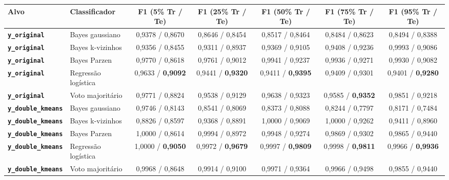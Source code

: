 \documentclass[a4paper,11pt]{article}
\begin{document}
\begin{center}
\begin{minipage}{\linewidth}
\centering
{}
\footnotesize
\sloppy
\setlength{\tabcolsep}{2.5pt}
\renewcommand{\arraystretch}{1.18}
\begin{tabularx}{\linewidth}{P{2.25cm} l C C C C C}
\toprule
\textbf{Alvo} & \textbf{Classificador} & \textbf{F1 (5\% Tr / Te)} & \textbf{F1 (25\% Tr / Te)} & \textbf{F1 (50\% Tr / Te)} & \textbf{F1 (75\% Tr / Te)} & \textbf{F1 (95\% Tr / Te)} \\
\midrule
\textbf{\texttt{y\_\allowbreak original}} & Bayes gaussiano & 0,9378 / 0,8670 & 0,8646 / 0,8454 & 0,8517 / 0,8464 & 0,8484 / 0,8623 & 0,8494 / 0,8388 \\
\textbf{\texttt{y\_\allowbreak original}} & Bayes k-vizinhos & 0,9356 / 0,8455 & 0,9311 / 0,8937 & 0,9369 / 0,9105 & 0,9408 / 0,9236 & 0,9993 / 0,9086 \\
\textbf{\texttt{y\_\allowbreak original}} & Bayes Parzen & 0,9770 / 0,8618 & 0,9761 / 0,9012 & 0,9941 / 0,9237 & 0,9936 / 0,9271 & 0,9930 / 0,9082 \\
\textbf{\texttt{y\_\allowbreak original}} & Regressão logística & 0,9633 / \textbf{0,9092} & 0,9441 / \textbf{0,9320} & 0,9411 / \textbf{0,9395} & 0,9409 / 0,9301 & 0,9401 / \textbf{0,9280} \\
\textbf{\texttt{y\_\allowbreak original}} & Voto majoritário & 0,9771 / 0,8824 & 0,9538 / 0,9129 & 0,9638 / 0,9323 & 0,9585 / \textbf{0,9352} & 0,9851 / 0,9218 \\
\textbf{\texttt{y\_\allowbreak double\_\allowbreak kmeans}} & Bayes gaussiano & 0,9746 / 0,8143 & 0,8541 / 0,8069 & 0,8373 / 0,8088 & 0,8244 / 0,7797 & 0,8171 / 0,7484 \\
\textbf{\texttt{y\_\allowbreak double\_\allowbreak kmeans}} & Bayes k-vizinhos & 0,8826 / 0,8597 & 0,9368 / 0,8891 & 1,0000 / 0,9069 & 1,0000 / 0,9262 & 0,9411 / 0,8960 \\
\textbf{\texttt{y\_\allowbreak double\_\allowbreak kmeans}} & Bayes Parzen & 1,0000 / 0,8614 & 0,9994 / 0,8972 & 0,9948 / 0,9274 & 0,9869 / 0,9302 & 0,9865 / 0,9440 \\
\textbf{\texttt{y\_\allowbreak double\_\allowbreak kmeans}} & Regressão logística & 1,0000 / \textbf{0,9050} & 0,9972 / \textbf{0,9679} & 0,9997 / \textbf{0,9809} & 0,9998 / \textbf{0,9811} & 0,9966 / \textbf{0,9936} \\
\textbf{\texttt{y\_\allowbreak double\_\allowbreak kmeans}} & Voto majoritário & 0,9968 / 0,8648 & 0,9914 / 0,9100 & 0,9971 / 0,9364 & 0,9966 / 0,9498 & 0,9855 / 0,9440 \\
\bottomrule
\end{tabularx}
\end{minipage}
\end{center}
\end{document}
